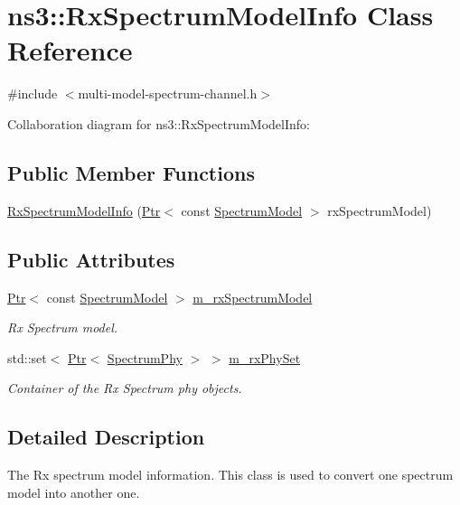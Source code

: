 \hypertarget{classns3_1_1RxSpectrumModelInfo}{}\section{ns3\+:\+:Rx\+Spectrum\+Model\+Info Class Reference}
\label{classns3_1_1RxSpectrumModelInfo}


{\ttfamily \#include $<$multi-\/model-\/spectrum-\/channel.\+h$>$}



Collaboration diagram for ns3\+:\+:Rx\+Spectrum\+Model\+Info\+:
\subsection*{Public Member Functions}
\begin{DoxyCompactItemize}
\item 
\hyperlink{classns3_1_1RxSpectrumModelInfo_ae0a1bf24fa5626d13ff48a9c927ac8d7}{Rx\+Spectrum\+Model\+Info} (\hyperlink{classns3_1_1Ptr}{Ptr}$<$ const \hyperlink{classns3_1_1SpectrumModel}{Spectrum\+Model} $>$ rx\+Spectrum\+Model)
\end{DoxyCompactItemize}
\subsection*{Public Attributes}
\begin{DoxyCompactItemize}
\item 
\hyperlink{classns3_1_1Ptr}{Ptr}$<$ const \hyperlink{classns3_1_1SpectrumModel}{Spectrum\+Model} $>$ \hyperlink{classns3_1_1RxSpectrumModelInfo_aead459b994759aa8107e6a22fceeb722}{m\+\_\+rx\+Spectrum\+Model}
\begin{DoxyCompactList}\small\item\em Rx Spectrum model. \end{DoxyCompactList}\item 
std\+::set$<$ \hyperlink{classns3_1_1Ptr}{Ptr}$<$ \hyperlink{classns3_1_1SpectrumPhy}{Spectrum\+Phy} $>$ $>$ \hyperlink{classns3_1_1RxSpectrumModelInfo_ac3239614b2b10e1a0aec925e9417b551}{m\+\_\+rx\+Phy\+Set}
\begin{DoxyCompactList}\small\item\em Container of the Rx Spectrum phy objects. \end{DoxyCompactList}\end{DoxyCompactItemize}


\subsection{Detailed Description}
The Rx spectrum model information. This class is used to convert one spectrum model into another one. 

